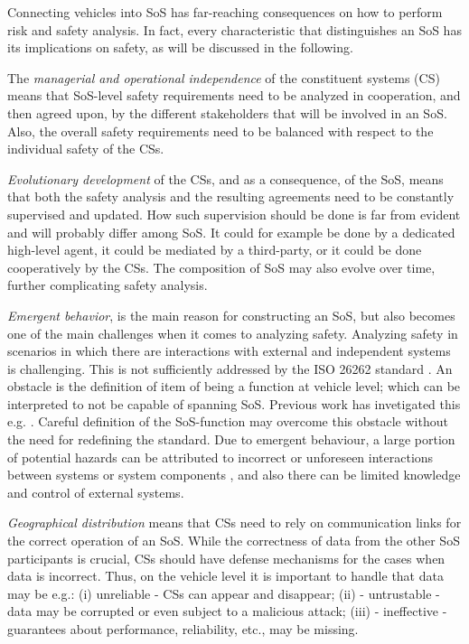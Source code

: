 
Connecting vehicles into SoS has far-reaching consequences on how to perform risk and safety analysis. In fact, every characteristic that distinguishes an SoS \cite{maier1996sos} has its implications on safety, as will be discussed in the following.

The \emph{managerial and operational independence} of the constituent systems (CS) means that SoS-level safety requirements need to be analyzed in cooperation, and then agreed upon, by the different stakeholders that will be involved in an SoS. Also, the overall safety requirements need to be balanced with respect to the individual safety of the CSs. 

\emph{Evolutionary development} of the CSs, and as a consequence, of the SoS, means that both the safety analysis and the resulting agreements need to be constantly supervised and updated. How such supervision should be done is far from evident and will probably differ among SoS. It could for example be done by a dedicated high-level agent, it could be mediated by a third-party, or it could be done cooperatively by the CSs. The composition of SoS may also evolve over time, further complicating safety analysis. 

\emph{Emergent behavior}, is the main reason for constructing an SoS, but also becomes one of the main challenges when it comes to analyzing safety. 
Analyzing safety in scenarios in which there are interactions with external and independent systems is challenging. This is not sufficiently addressed by the ISO 26262 standard \cite{iso26262}. An obstacle is the definition of item of being a function at vehicle level; which can be interpreted to not be capable of spanning SoS. Previous work has invetigated this e.g. \cite{NilssonFuSainCoop}. Careful definition of the SoS-function may overcome this obstacle without the need for redefining the standard.
Due to emergent behaviour, a large portion of potential hazards can be attributed to incorrect or unforeseen interactions between systems or system components \cite{rasmussen1997risk, leveson2011stamp}, and also there can be limited knowledge and control of external systems. 

\emph{Geographical distribution} means that CSs need to rely on communication links for the correct operation of an SoS. While the correctness of data from the other SoS participants is crucial, CSs should have defense mechanisms for the cases when data is incorrect. Thus, on the vehicle level it is important to handle that data may be e.g.: (i) unreliable - CSs can appear and disappear; (ii) - untrustable - data may be corrupted or even subject to a malicious attack; (iii) - ineffective - guarantees about performance, reliability, etc., may be missing. 

